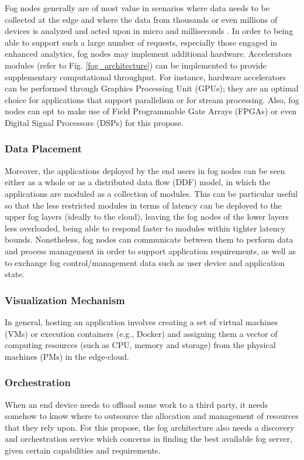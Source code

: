 \noindent\tab Fog nodes generally are of most value in scenarios where data needs to be collected at the edge and where the data from thousands or even millions of devices is analyzed and acted upon in micro and milliseconds \cite{openfog2017openfog}. In order to being able to support such a large number of requests, especially those engaged in enhanced analytics, fog nodes may implement additional hardware. Accelerators modules (refer to Fig. \ref{fog_architecture}) can be implemented to provide supplementary computational throughput. For instance, hardware accelerators can be performed through Graphics Processing Unit (GPUs); they are an optimal choice for applications that support parallelism or for stream processing. Also, fog nodes can opt to make use of Field Programmable Gate Arrays (FPGAs) or even Digital Signal Processors (DSPs) for this propose.
\subsubsection{Data Placement}

\noindent\tab Moreover, the applications deployed by the end users in fog nodes can be seen either as a whole or as a distributed data flow (DDF) model, in which the applications are moduled as a collection of modules. This can be particular useful so that the less restricted modules in terms of latency can be deployed to the upper fog layers (ideally to the cloud), leaving the fog nodes of the lower layers less overloaded, being able to respond faster to modules within tighter latency bounds. Nonetheless, fog nodes can communicate between them to perform data and process management in order to support application requirements, as well as to exchange fog control/management data such as user device and application state.\\

\subsubsection{Visualization Mechanism}

In general, hosting an application involves creating a set of virtual machines (VMs) or execution containers (e.g., Docker) and assigning them a vector of computing resources (such as CPU, memory and storage) from the physical machines (PMs) in the edge-cloud.

\subsubsection{Orchestration}
\noindent\tab When an end device needs to offload some work to a third party, it needs somehow to know where to outsource the allocation and management of resources that they rely upon. For this propose, the fog architecture also needs a discovery and orchestration service which concerns in finding the best available fog server, given certain capabilities and requirements.\\

